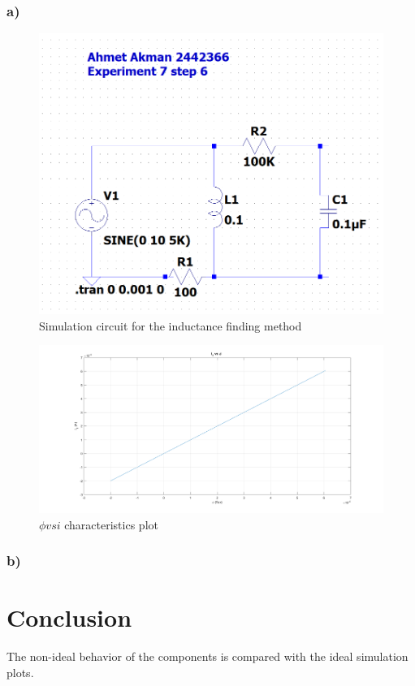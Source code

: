 \documentclass[letterpaper,12pt]{article}
\begin{document}
\subsubsection{a)}
\begin{figure}[H]
	\centering
   \includegraphics[width=1\textwidth]{6_SCH.png}
   \caption{Simulation circuit for the inductance finding method}
\end{figure}

\begin{figure}[H]
	\centering
   \includegraphics[width=1\textwidth]{PRE_7c.png}
   \caption{\(\phi vs i\) characteristics plot}
\end{figure}
\subsubsection{b)}

\section{Conclusion}
The non-ideal behavior of the components is compared with the ideal simulation plots.
\end{document}
